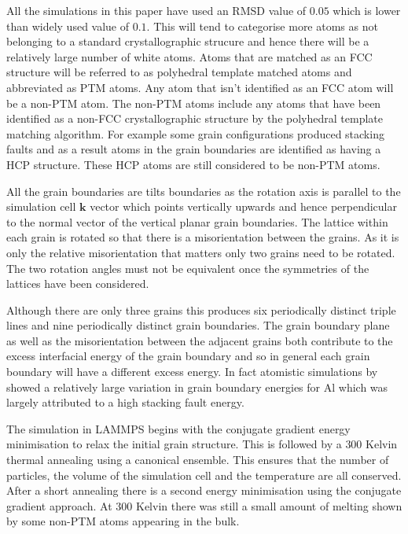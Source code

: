 \documentclass[12pt,a4paper]{book}
\begin{document}
All the simulations in this paper have used an RMSD value of $0.05$ which is lower than widely used value of $0.1$. This will tend to categorise more atoms as not belonging to a standard crystallographic strucure and hence there will be a relatively large number of white atoms. Atoms that are matched as an FCC structure will be referred to as polyhedral template matched atoms and abbreviated as PTM atoms. Any atom that isn't identified as an FCC atom will be a non-PTM atom. The non-PTM atoms include any atoms that have been identified as a non-FCC crystallographic structure by the polyhedral template matching algorithm. For example some grain configurations produced stacking faults and as a result atoms in the grain boundaries are identified as having a HCP structure. These HCP atoms are still considered to be non-PTM atoms.
 
All the grain boundaries are tilts boundaries as the rotation axis is parallel to the simulation cell $\mathbf{k}$ vector which points vertically upwards and hence perpendicular to the normal vector of the vertical planar grain boundaries. The lattice within each grain is rotated so that there is a misorientation between the grains. As it is only the relative misorientation that matters only two grains need to be rotated. The two rotation angles must not be equivalent once the symmetries of the lattices have been considered. 

Although there are only three grains this produces six periodically distinct triple lines and nine periodically distinct grain boundaries. The grain boundary plane as well as the misorientation between the adjacent grains both contribute to the excess interfacial energy of the grain boundary and so in general each grain boundary will have a different excess energy. In fact atomistic simulations by \cite{HOLM2010905} showed a relatively large variation in grain boundary energies for Al which was largely attributed to a high stacking fault energy. 

The simulation in LAMMPS begins with the conjugate gradient energy minimisation to relax the initial grain structure. This is followed by a $300$ Kelvin thermal annealing using a canonical ensemble. This ensures that the number of particles, the volume of the simulation cell and the temperature are all conserved. After a short annealing there is a second energy minimisation using the conjugate gradient approach. At $300$ Kelvin there was still a small amount of melting shown by some non-PTM atoms appearing in the bulk. 
\end{document}
